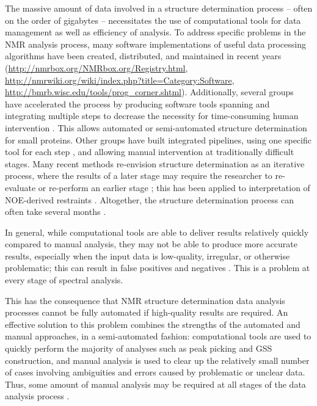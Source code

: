 The massive amount of data involved in a structure determination process --
often on the order of gigabytes -- necessitates the use of computational
tools for data management as well as efficiency of analysis.  To address
specific problems in the NMR analysis process, many software implementations 
of useful data processing algorithms have been created, distributed, and 
maintained in recent years 
(\url{http://nmrbox.org/NMRbox.org/Registry.html}, 
\url{http://nmrwiki.org/wiki/index.php?title=Category:Software}, 
\url{http://bmrb.wisc.edu/tools/prog\_corner.shtml}).  
Additionally, several groups have 
accelerated the process by producing software tools spanning and integrating 
multiple steps to decrease the necessity for time-consuming human intervention
\cite{abacus_assignment}.
This allows automated or semi-automated structure determination for small 
proteins.  Other groups have built integrated pipelines, using one specific 
tool for each step \cite{baran2004automated, sail_flya}, 
and allowing manual intervention at traditionally 
difficult stages.  Many recent methods re-envision structure determination 
as an iterative process, where the results of a later stage may require the 
researcher to re-evaluate or re-perform an earlier stage \cite{cyana2004}; 
this has been applied to interpretation of NOE-derived 
restraints \cite{aria2003}.  Altogether, the structure determination 
process can often take several months \cite{guerry2011automated}.

In general, while computational tools are able to deliver results relatively 
quickly compared to manual analysis, they may not be able to produce more 
accurate results, especially when the input data is low-quality, irregular, or 
otherwise problematic; this can result in false positives and negatives
\cite{williamson2009automated}.  This is a problem at every stage of spectral
analysis.

This has the consequence that NMR structure determination data analysis 
processes cannot be fully automated if high-quality results are required.  
An effective solution to this problem combines the strengths of the automated 
and manual approaches, in a semi-automated fashion:  computational tools are 
used to quickly perform the majority of analyses such as peak picking and 
GSS construction, and manual analysis is used to clear up the 
relatively small number of cases involving ambiguities and errors caused 
by problematic or unclear data.  Thus, some amount of manual analysis may 
be required at all stages of the data analysis process 
\cite{guntert2009automated, williamson2009automated}.   

